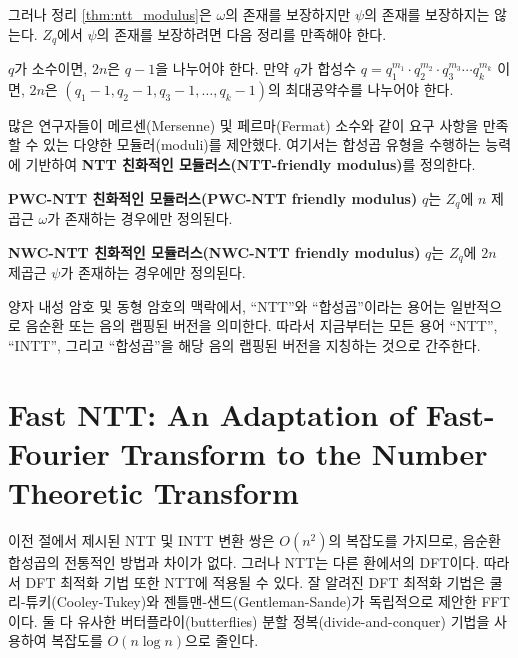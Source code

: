 그러나 정리 \ref{thm:ntt_modulus}은 $\omega$의 존재를 보장하지만 $\psi$의 존재를 보장하지는 않는다. $Z_q$에서 $\psi$의 존재를 보장하려면 다음 정리를 만족해야 한다.

\begin{tcolorbox}[colback=white, boxrule=0.7pt, sharp corners]
\begin{theorem}
$q$가 소수이면, $2n$은 $q-1$을 나누어야 한다. 만약 $q$가 합성수 $q = q_1^{m_1} \cdot q_2^{m_2} \cdot q_3^{m_3} \cdots q_k^{m_k}$ 이면, $2n$은 $(q_1-1, q_2-1, q_3-1, \dots, q_k-1)$의 최대공약수를 나누어야 한다.
\end{theorem}
\end{tcolorbox}

많은 연구자들이 메르센(Mersenne) 및 페르마(Fermat) 소수와 같이 요구 사항을 만족할 수 있는 다양한 모듈러(moduli)를 제안했다. 여기서는 합성곱 유형을 수행하는 능력에 기반하여 \textbf{NTT 친화적인 모듈러스(NTT-friendly modulus)}를 정의한다.

\begin{tcolorbox}[colback=white, boxrule=0.7pt, sharp corners]
\begin{definition}
\textbf{PWC-NTT 친화적인 모듈러스(PWC-NTT friendly modulus)} $q$는 $Z_q$에 $n$ 제곱근 $\omega$가 존재하는 경우에만 정의된다.
\end{definition}
\end{tcolorbox}

\begin{tcolorbox}[colback=white, boxrule=0.7pt, sharp corners]
\begin{definition}
\textbf{NWC-NTT 친화적인 모듈러스(NWC-NTT friendly modulus)} $q$는 $Z_q$에 $2n$ 제곱근 $\psi$가 존재하는 경우에만 정의된다.
\end{definition}
\end{tcolorbox}

양자 내성 암호 및 동형 암호의 맥락에서, ``NTT''와 ``합성곱''이라는 용어는 일반적으로 음순환 또는 음의 랩핑된 버전을 의미한다. 따라서 지금부터는 모든 용어 ``NTT'', ``INTT'', 그리고 ``합성곱''을 해당 음의 랩핑된 버전을 지칭하는 것으로 간주한다.

\section{Fast NTT: An Adaptation of Fast-Fourier Transform to the
Number Theoretic Transform}

이전 절에서 제시된 NTT 및 INTT 변환 쌍은 $O(n^2)$의 복잡도를 가지므로, 음순환 합성곱의 전통적인 방법과 차이가 없다. 그러나 NTT는 다른 환에서의 DFT이다. 따라서 DFT 최적화 기법 또한 NTT에 적용될 수 있다. 잘 알려진 DFT 최적화 기법은 쿨리-튜키(Cooley-Tukey)와 젠틀맨-샌드(Gentleman-Sande)가 독립적으로 제안한 FFT이다. 둘 다 유사한 버터플라이(butterflies) 분할 정복(divide-and-conquer) 기법을 사용하여 복잡도를 $O(n \log n)$으로 줄인다.

